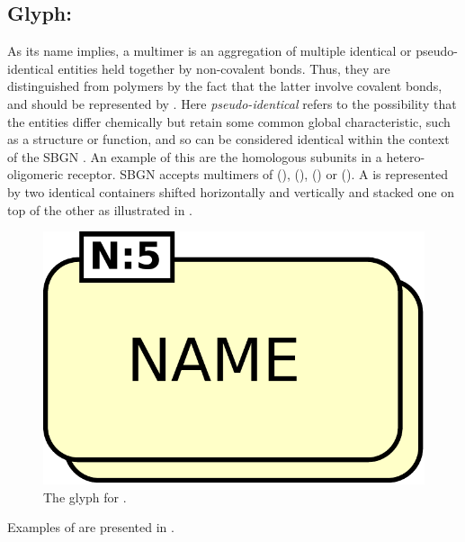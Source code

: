\subsection{Glyph: }
\label{sec:multimer}

As its name implies, a multimer is an aggregation of multiple identical or pseudo-identical entities held together by non-covalent bonds. Thus, they are distinguished from polymers by the fact that the latter involve covalent bonds, and should be represented by . Here \emph{pseudo-identical} refers to the possibility that the entities differ chemically but retain some common global characteristic, such as a structure or function, and so can be considered identical within the context of the SBGN \PD.  An example of this are the homologous subunits in a hetero-oligomeric receptor. SBGN \PD accepts multimers of  (),  (),  () or  (). A  is represented by two identical containers shifted horizontally and vertically and stacked one on top of the other as illustrated in .

\begin{figure}[H]
  \centering
  \includegraphics[scale = 0.3]{images/multimer}
  \caption{The \PD glyph for . }
  \label{fig:multimer}
\end{figure}

Examples of  are presented in .


